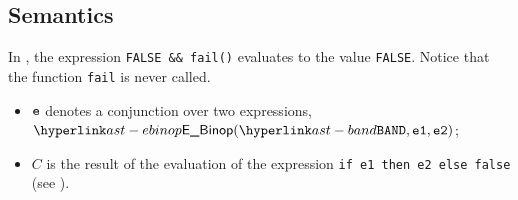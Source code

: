 \begin{mathpar}
\end{mathpar}

\subsection{Semantics}
In ,
the expression \texttt{FALSE \&\& fail()} evaluates to the value \texttt{FALSE}. Notice that the function \texttt{fail} is never called.

\ProseParagraph
\AllApply
\begin{itemize}
\item $\ve$ denotes a conjunction over two expressions,
      $\EBinop(\BAND, \veone, \vetwo)$;
\item $C$ is the result of the evaluation of the expression
      \texttt{if e1 then e2 else false} (see ).
\end{itemize}

\FormallyParagraph
\begin{mathpar}
\end{mathpar}

